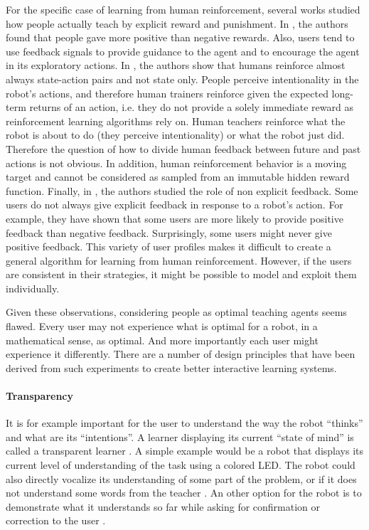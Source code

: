 For the specific case of learning from human reinforcement, several works studied how people actually teach by explicit reward and punishment. In \cite{thomaz2006reinforcement}, the authors found that people gave more positive than negative rewards. Also, users tend to use feedback signals to provide guidance to the agent and to encourage the agent in its exploratory actions. In \cite{knox2009design}, the authors show that humans reinforce almost always state-action pairs and not state only. People perceive intentionality in the robot's actions, and therefore human trainers reinforce given the expected long-term returns of an action, i.e. they do not provide a solely immediate reward as reinforcement learning algorithms rely on. Human teachers reinforce what the robot is about to do (they perceive intentionality) or what the robot just did. Therefore the question of how to divide human feedback between future and past actions is not obvious. In addition, human reinforcement behavior is a moving target and cannot be considered as sampled from an immutable hidden reward function. Finally, in \cite{loftinlearning}, the authors studied the role of non explicit feedback. Some users do not always give explicit feedback in response to a robot's action. For example, they have shown that some users are more likely to provide positive feedback than negative feedback. Surprisingly, some users might never give positive feedback. This variety of user profiles makes it difficult to create a general algorithm for learning from human reinforcement. However, if the users are consistent in their strategies, it might be possible to model and exploit them individually. 

Given these observations, considering people as optimal teaching agents seems flawed. Every user may not experience what is optimal for a robot, in a mathematical sense, as optimal. And more importantly each user might experience it differently. There are a number of design principles that have been derived from such experiments to create better interactive learning systems.

\paragraph{Transparency} It is for example important for the user to understand the way the robot ``thinks'' and what are its ``intentions''. A learner displaying its current ``state of mind'' is called a transparent learner \cite{thomaz2008teachable}. A simple example would be a robot that displays its current level of understanding of the task using a colored LED. The robot could also directly vocalize its understanding of some part of the problem, or if it does not understand some words from the teacher \cite{chao2010transparent}. An other option for the robot is to demonstrate what it understands so far while asking for confirmation or correction to the user \cite{cakmak2012designing}.

